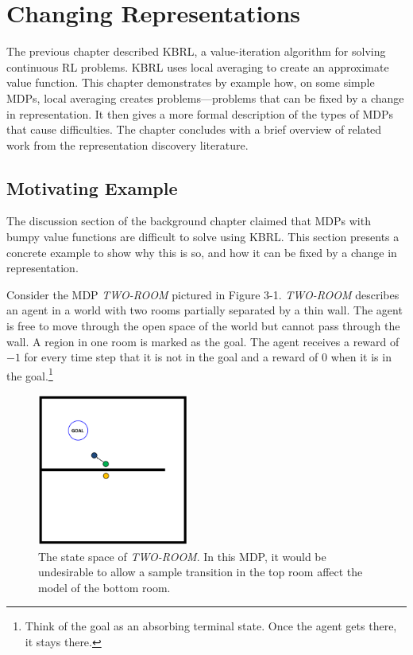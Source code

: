 \chapter{Changing Representations}
The previous chapter described KBRL, a value-iteration
algorithm for solving continuous RL problems.
KBRL uses local averaging to create an approximate value function.
This chapter demonstrates by example how, on some simple MDPs,
local averaging creates
problems---problems that can be fixed by a change in representation.
It then gives a more formal description of the types of MDPs that
cause difficulties.
The chapter concludes with a brief overview of related work from the
representation discovery literature.

\section{Motivating Example}
The discussion section of the background chapter claimed that MDPs with
bumpy value functions are difficult to solve using KBRL.
This section presents a concrete example to show why this is so, and how 
it can be fixed by a change in representation.

Consider the MDP \textit{TWO-ROOM} pictured in Figure 3-1.
\textit{TWO-ROOM} describes an agent in a world with two rooms partially
separated by a thin wall.
The agent is free to move through the open space of the world but cannot
pass through the wall.
A region in one room is marked as the goal.
The agent receives a reward of $-1$ for every time step that it is not in
the goal and a reward of $0$ when it is in the goal.\footnote{Think
of the goal as an absorbing terminal state. Once the agent gets there,
it stays there.}

\begin{figure}[!!!ht]
  \centering
    \includegraphics[width=50mm]{figs/tworoom.pdf}
  \caption[The state space of \textit{TWO-ROOM}]
  {The state space of \textit{TWO-ROOM}.
    In this MDP, it would be undesirable to allow a sample transition
    in the top room affect the model of the bottom room.}
\end{figure}

